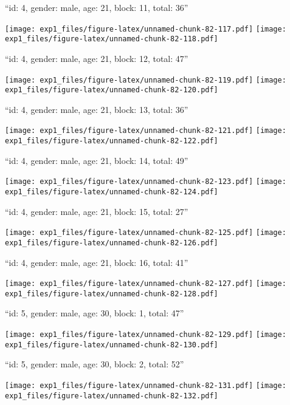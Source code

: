 \documentclass[11pt,,]{article}
\begin{document}
\newpage
[1] 

``id: 4, gender: male, age: 21, block: 11, total: 36''

\texttt{[image: exp1\_files/figure-latex/unnamed-chunk-82-117.pdf]}
\texttt{[image: exp1\_files/figure-latex/unnamed-chunk-82-118.pdf]}

\newpage
[1] 

``id: 4, gender: male, age: 21, block: 12, total: 47''

\texttt{[image: exp1\_files/figure-latex/unnamed-chunk-82-119.pdf]}
\texttt{[image: exp1\_files/figure-latex/unnamed-chunk-82-120.pdf]}

\newpage
[1] 

``id: 4, gender: male, age: 21, block: 13, total: 36''

\texttt{[image: exp1\_files/figure-latex/unnamed-chunk-82-121.pdf]}
\texttt{[image: exp1\_files/figure-latex/unnamed-chunk-82-122.pdf]}

\newpage
[1] 

``id: 4, gender: male, age: 21, block: 14, total: 49''

\texttt{[image: exp1\_files/figure-latex/unnamed-chunk-82-123.pdf]}
\texttt{[image: exp1\_files/figure-latex/unnamed-chunk-82-124.pdf]}

\newpage
[1] 

``id: 4, gender: male, age: 21, block: 15, total: 27''

\texttt{[image: exp1\_files/figure-latex/unnamed-chunk-82-125.pdf]}
\texttt{[image: exp1\_files/figure-latex/unnamed-chunk-82-126.pdf]}

\newpage
[1] 

``id: 4, gender: male, age: 21, block: 16, total: 41''

\texttt{[image: exp1\_files/figure-latex/unnamed-chunk-82-127.pdf]}
\texttt{[image: exp1\_files/figure-latex/unnamed-chunk-82-128.pdf]}

\newpage
[1] 

``id: 5, gender: male, age: 30, block: 1, total: 47''

\texttt{[image: exp1\_files/figure-latex/unnamed-chunk-82-129.pdf]}
\texttt{[image: exp1\_files/figure-latex/unnamed-chunk-82-130.pdf]}

\newpage
[1] 

``id: 5, gender: male, age: 30, block: 2, total: 52''

\texttt{[image: exp1\_files/figure-latex/unnamed-chunk-82-131.pdf]}
\texttt{[image: exp1\_files/figure-latex/unnamed-chunk-82-132.pdf]}
\end{document}
